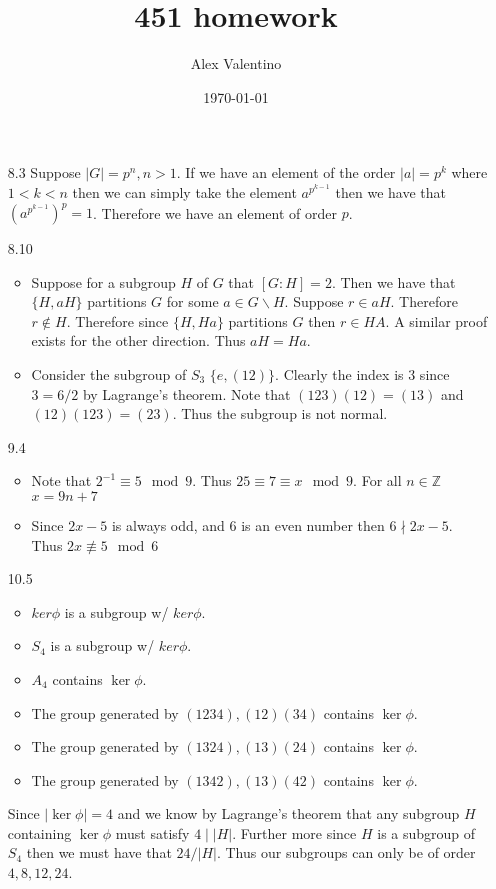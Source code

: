 \documentclass[12pt, letterpaper]{article}
\date{\today}
\author{Alex Valentino}
\title{451 homework}
\newcommand{\Z}{\mathbb{Z}}
\begin{document}
\begin{enumerate}
	\item[8.3] Suppose $|G| = p^n, n > 1$. If we have an element of the order $|a| = p^k$ where $1 < k < n$ then we can simply take the element
	$a^{p^{k-1}}$ then we have that $(a^{p^{k-1}})^p = 1$.   Therefore we have an element of order $p$.
	\item[8.10]
	\begin{itemize}
		\item Suppose for a subgroup $H$ of $G$ that $[G:H]=2$.  
		Then we have that $\{H, aH\}$ partitions $G$ for some $a \in G \backslash H$.  Suppose $r \in aH$.  Therefore $r \not \in H$.  Therefore since $\{H,Ha\}$ partitions $G$ then $r \in HA$. A similar proof exists for 
		the other direction.  Thus $aH = Ha$.  
		\item Consider the subgroup of $S_3$  $\{e, (12)\}$.  Clearly 
		the index is 3 since $3 = 6/2$ by Lagrange's theorem.  
		Note that $(123)(12) = (13)$ and $(12)(123) = (23)$.  Thus the 
		subgroup is not normal.  
	\end{itemize}
	\item[9.4] 
	\begin{itemize}
		\item Note that 	$2^{-1} \equiv 5 \mod{9}$.  Thus $25 \equiv 7 \equiv x \mod{9}$.   For all $n \in \Z$ $x = 9n + 7$
		\item Since $2x-5$ is always odd, and $6$ is an even number then 
		$6 \nmid 2x -5$.  Thus $2x \not \equiv 5 \mod 6$
	\end{itemize}
	\item[10.5] 
	\begin{itemize}
		\item $ker \phi$ is a subgroup w/ $ker \phi$.
		\item $S_4$ is a subgroup w/ $ker \phi$.
		\item $A_4$ contains $\ker \phi$.  
		\item The group generated by $(1234), (12)(34)$ contains $\ker \phi$.
		\item The group generated by $(1324), (13)(24)$ contains $\ker \phi$.
		\item The group generated by $(1342), (13)(42)$ contains $\ker \phi$.
	\end{itemize}
	\iffalse Since $|\ker \phi| = 4$ and we know by Lagrange's theorem that any subgroup $H$ containing $\ker \phi$ must satisfy $4 \mid |H|$.
	Further more since $H$ is a subgroup of $S_4$ then we must have that 
	$24/|H|$.  Thus our subgroups can only be of order $4,8,12, 24$.

\end{enumerate}
\end{document}
